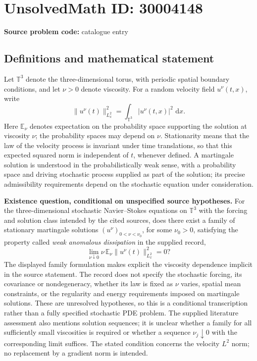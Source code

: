 \documentclass[11pt]{article}
\newcommand{\dd}{\,\mathrm{d}}
\begin{document}
\section*{UnsolvedMath ID: 30004148}
\textbf{Source problem code:} catalogue entry
\subsection{Definitions and mathematical statement}
Let \(\mathbb T^3\) denote the three-dimensional torus, with periodic spatial boundary conditions, and let \(\nu>0\) denote viscosity. For a random velocity field \(u^\nu(t,x)\), write
\[
\|u^\nu(t)\|_{L^2_x}^2=\int_{\mathbb T^3}|u^\nu(t,x)|^2\,\dd x.
\]
Here \(\mathbb E_\nu\) denotes expectation on the probability space supporting the solution at viscosity \(\nu\); the probability spaces may depend on \(\nu\). Stationarity means that the law of the velocity process is invariant under time translations, so that this expected squared norm is independent of \(t\), whenever defined. A martingale solution is understood in the probabilistically weak sense, with a probability space and driving stochastic process supplied as part of the solution; its precise admissibility requirements depend on the stochastic equation under consideration.

\textbf{Existence question, conditional on unspecified source hypotheses.} For the three-dimensional stochastic Navier--Stokes equations on \(\mathbb T^3\) with the forcing and solution class intended by the cited sources, does there exist a family of stationary martingale solutions \((u^\nu)_{0<\nu<\nu_0}\), for some \(\nu_0>0\), satisfying the property called \emph{weak anomalous dissipation} in the supplied record,
\[
\lim_{\nu\downarrow0}\nu\,\mathbb E_\nu\|u^\nu(t)\|_{L^2_x}^2=0?
\]
The displayed family formulation makes explicit the viscosity dependence implicit in the source statement. The record does not specify the stochastic forcing, its covariance or nondegeneracy, whether its law is fixed as \(\nu\) varies, spatial mean constraints, or the regularity and energy requirements imposed on martingale solutions. These are unresolved hypotheses, so this is a conditional transcription rather than a fully specified stochastic PDE problem. The supplied literature assessment also mentions solution sequences; it is unclear whether a family for all sufficiently small viscosities is required or whether a sequence \(\nu_j\downarrow0\) with the corresponding limit suffices. The stated condition concerns the velocity \(L^2\) norm; no replacement by a gradient norm is intended.
\end{document}
